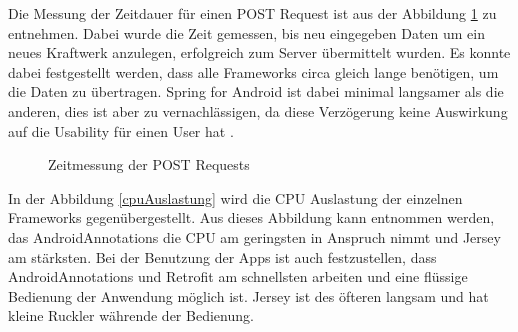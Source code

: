 Die Messung der Zeitdauer für einen POST Request ist aus der Abbildung \ref{postRequests} zu entnehmen. Dabei wurde die Zeit gemessen, bis neu eingegeben Daten um ein neues Kraftwerk anzulegen, erfolgreich zum Server übermittelt wurden. Es konnte dabei festgestellt werden, dass alle Frameworks circa gleich lange benötigen, um die Daten zu übertragen. Spring for Android ist dabei minimal langsamer als die anderen, dies ist aber zu vernachlässigen, da diese Verzögerung keine Auswirkung auf die Usability für einen User hat \cite{meyer:performance}.

\begin{figure} [ht]
	\centering
	 \qquad
	 \qquad
	 \qquad
	\caption{Zeitmessung der POST Requests} 
	\label{postRequests}
\end{figure} 

In der Abbildung \ref{cpuAuslastung} wird die CPU Auslastung der einzelnen Frameworks gegenübergestellt. Aus dieses Abbildung kann entnommen werden, das AndroidAnnotations die CPU am geringsten in Anspruch nimmt und Jersey am stärksten. Bei der Benutzung der Apps ist auch festzustellen, dass AndroidAnnotations und Retrofit am schnellsten arbeiten und eine flüssige Bedienung der Anwendung möglich ist. Jersey ist des öfteren langsam und hat kleine Ruckler währende der Bedienung.  

